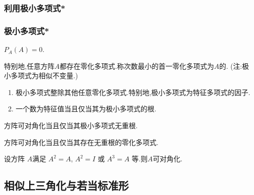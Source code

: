 \subsubsection{利用极小多项式*}
\begin{frame}\frametitle{极小多项式*}
\begin{theorem}
$P_A(A)=0$.
\end{theorem}
\pp
特别地,任意方阵$A$都存在零化多项式.称次数最小的首一零化多项式为$A$的.
(注:极小多项式为相似不变量.)
\pp
\begin{proposition}
\begin{enumerate}
\item 极小多项式整除其他任意零化多项式.特别地,极小多项式为特征多项式的因子.
\pp
\item 一个数为特征值当且仅当其为极小多项式的根.
\end{enumerate}
\end{proposition}
\pp
\begin{theorem}[利用极小多项式]
方阵可对角化当且仅当其极小多项式无重根.
\end{theorem}
\pp
%
\begin{corollary}[利用零化多项式]
方阵可对角化当且仅当其存在无重根的零化多项式.
\end{corollary}
\pp
{} 设方阵 $A$满足 $A^2=A$, $A^2=I$ 或 $A^3=A$ 等.则$A$可对角化.
\end{frame}











\subsection{相似上三角化与若当标准形}


